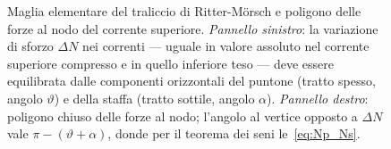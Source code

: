 \begin{figure}[htbp]
	\caption{Maglia elementare del traliccio di Ritter-Mörsch
		e poligono delle forze al nodo del corrente superiore.
		\emph{Pannello sinistro}: la variazione di sforzo
		$\Delta N$ nei correnti --- uguale in valore assoluto
		nel corrente superiore compresso e in quello inferiore
		teso --- deve essere equilibrata dalle componenti
		orizzontali del puntone (tratto spesso, angolo
		$\vartheta$) e della staffa (tratto sottile, angolo
		$\alpha$).
		\emph{Pannello destro}: poligono chiuso delle forze
		al nodo; l'angolo al vertice opposto a $\Delta N$
		vale $\pi - (\vartheta+\alpha)$, donde per il
		teorema dei seni le~\eqref{eq:Np_Ns}.}
	\label{fig:maglia_Morsch}
\end{figure}
